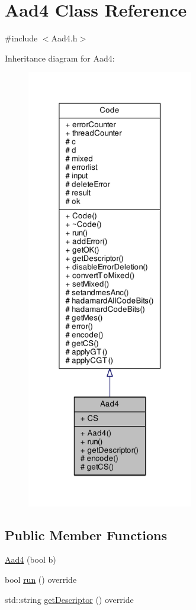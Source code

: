 \hypertarget{class_aad4}{}\section{Aad4 Class Reference}
\label{class_aad4}


{\ttfamily \#include $<$Aad4.\+h$>$}



Inheritance diagram for Aad4\+:\nopagebreak
\begin{figure}[H]
\begin{center}
\leavevmode
\includegraphics[height=550pt]{class_aad4__inherit__graph}
\end{center}
\end{figure}
\subsection*{Public Member Functions}
\begin{DoxyCompactItemize}
\item 
\hyperlink{class_aad4_af5a8655a7236239eeaddd65fb04bbf98}{Aad4} (bool b)
\item 
bool \hyperlink{class_aad4_a95f5ec483584c48bde0fd96d4d347c34}{run} () override
\item 
std\+::string \hyperlink{class_aad4_ad697e56ab152cd1228bd26f73451ec42}{get\+Descriptor} () override
\end{DoxyCompactItemize}
